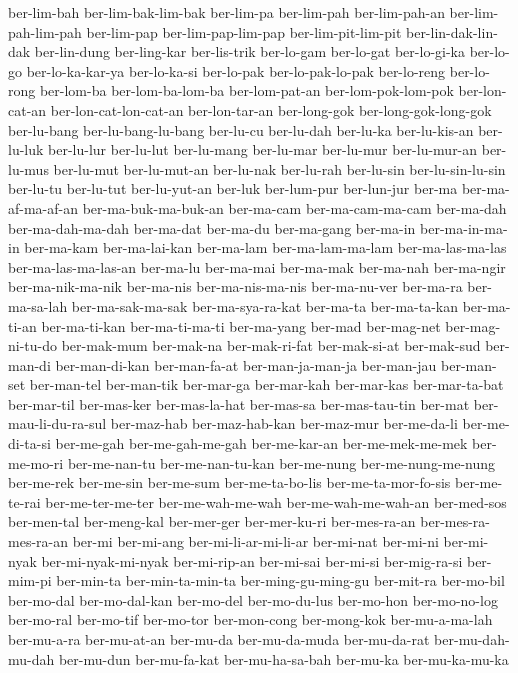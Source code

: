 {ber-lim-bah ber-lim-bak-lim-bak ber-lim-pa ber-lim-pah ber-lim-pah-an
ber-lim-pah-lim-pah ber-lim-pap ber-lim-pap-lim-pap ber-lim-pit-lim-pit
ber-lin-dak-lin-dak ber-lin-dung ber-ling-kar ber-lis-trik ber-lo-gam
ber-lo-gat ber-lo-gi-ka ber-lo-go ber-lo-ka-kar-ya ber-lo-ka-si ber-lo-pak
ber-lo-pak-lo-pak ber-lo-reng ber-lo-rong ber-lom-ba ber-lom-ba-lom-ba
ber-lom-pat-an ber-lom-pok-lom-pok ber-lon-cat-an ber-lon-cat-lon-cat-an
ber-lon-tar-an ber-long-gok ber-long-gok-long-gok ber-lu-bang
ber-lu-bang-lu-bang ber-lu-cu ber-lu-dah ber-lu-ka ber-lu-kis-an
ber-lu-luk ber-lu-lur ber-lu-lut ber-lu-mang ber-lu-mar ber-lu-mur
ber-lu-mur-an ber-lu-mus ber-lu-mut ber-lu-mut-an ber-lu-nak ber-lu-rah
ber-lu-sin ber-lu-sin-lu-sin ber-lu-tu ber-lu-tut ber-lu-yut-an ber-luk
ber-lum-pur ber-lun-jur ber-ma ber-ma-af-ma-af-an ber-ma-buk-ma-buk-an
ber-ma-cam ber-ma-cam-ma-cam ber-ma-dah ber-ma-dah-ma-dah ber-ma-dat
ber-ma-du ber-ma-gang ber-ma-in ber-ma-in-ma-in ber-ma-kam ber-ma-lai-kan
ber-ma-lam ber-ma-lam-ma-lam ber-ma-las-ma-las ber-ma-las-ma-las-an
ber-ma-lu ber-ma-mai ber-ma-mak ber-ma-nah ber-ma-ngir ber-ma-nik-ma-nik
ber-ma-nis ber-ma-nis-ma-nis ber-ma-nu-ver ber-ma-ra ber-ma-sa-lah
ber-ma-sak-ma-sak ber-ma-sya-ra-kat ber-ma-ta ber-ma-ta-kan ber-ma-ti-an
ber-ma-ti-kan ber-ma-ti-ma-ti ber-ma-yang ber-mad ber-mag-net
ber-mag-ni-tu-do ber-mak-mum ber-mak-na ber-mak-ri-fat ber-mak-si-at
ber-mak-sud ber-man-di ber-man-di-kan ber-man-fa-at ber-man-ja-man-ja
ber-man-jau ber-man-set ber-man-tel ber-man-tik ber-mar-ga ber-mar-kah
ber-mar-kas ber-mar-ta-bat ber-mar-til ber-mas-ker ber-mas-la-hat
ber-mas-sa ber-mas-tau-tin ber-mat ber-mau-li-du-ra-sul ber-maz-hab
ber-maz-hab-kan ber-maz-mur ber-me-da-li ber-me-di-ta-si ber-me-gah
ber-me-gah-me-gah ber-me-kar-an ber-me-mek-me-mek ber-me-mo-ri
ber-me-nan-tu ber-me-nan-tu-kan ber-me-nung ber-me-nung-me-nung ber-me-rek
ber-me-sin ber-me-sum ber-me-ta-bo-lis ber-me-ta-mor-fo-sis ber-me-te-rai
ber-me-ter-me-ter ber-me-wah-me-wah ber-me-wah-me-wah-an ber-med-sos
ber-men-tal ber-meng-kal ber-mer-ger ber-mer-ku-ri ber-mes-ra-an
ber-mes-ra-mes-ra-an ber-mi ber-mi-ang ber-mi-li-ar-mi-li-ar ber-mi-nat
ber-mi-ni ber-mi-nyak ber-mi-nyak-mi-nyak ber-mi-rip-an ber-mi-sai
ber-mi-si ber-mig-ra-si ber-mim-pi ber-min-ta ber-min-ta-min-ta
ber-ming-gu-ming-gu ber-mit-ra ber-mo-bil ber-mo-dal ber-mo-dal-kan
ber-mo-del ber-mo-du-lus ber-mo-hon ber-mo-no-log ber-mo-ral ber-mo-tif
ber-mo-tor ber-mon-cong ber-mong-kok ber-mu-a-ma-lah ber-mu-a-ra
ber-mu-at-an ber-mu-da ber-mu-da-muda ber-mu-da-rat ber-mu-dah-mu-dah
ber-mu-dun ber-mu-fa-kat ber-mu-ha-sa-bah ber-mu-ka ber-mu-ka-mu-ka
}

